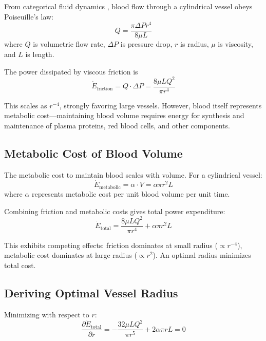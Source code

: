 \documentclass[12pt,a4paper]{article}
\theoremstyle{remark}
\begin{document}
From categorical fluid dynamics \cite{sachikonye2024fluid}, blood flow through a cylindrical vessel obeys Poiseuille's law:
\begin{equation}
Q = \frac{\pi \Delta P r^{4}}{8 \mu L}
\end{equation}
where $Q$ is volumetric flow rate, $\Delta P$ is pressure drop, $r$ is radius, $\mu$ is viscosity, and $L$ is length.

The power dissipated by viscous friction is
\begin{equation}
\dot{E}_{\mathrm{friction}} = Q \cdot \Delta P = \frac{8\mu L Q^{2}}{\pi r^{4}}
\end{equation}

This scales as $r^{-4}$, strongly favoring large vessels. However, blood itself represents metabolic cost—maintaining blood volume requires energy for synthesis and maintenance of plasma proteins, red blood cells, and other components.

\subsection{Metabolic Cost of Blood Volume}

The metabolic cost to maintain blood scales with volume. For a cylindrical vessel:
\begin{equation}
\dot{E}_{\mathrm{metabolic}} = \alpha \cdot V = \alpha \pi r^{2} L
\end{equation}
where $\alpha$ represents metabolic cost per unit blood volume per unit time.

Combining friction and metabolic costs gives total power expenditure:
\begin{equation}
\dot{E}_{\mathrm{total}} = \frac{8\mu L Q^{2}}{\pi r^{4}} + \alpha \pi r^{2} L
\end{equation}

This exhibits competing effects: friction dominates at small radius ($\propto r^{-4}$), metabolic cost dominates at large radius ($\propto r^{2}$). An optimal radius minimizes total cost.

\subsection{Deriving Optimal Vessel Radius}

Minimizing with respect to $r$:
\begin{equation}
\frac{\partial \dot{E}_{\mathrm{total}}}{\partial r} = -\frac{32\mu L Q^{2}}{\pi r^{5}} + 2\alpha \pi r L = 0
\end{equation}
\end{document}
